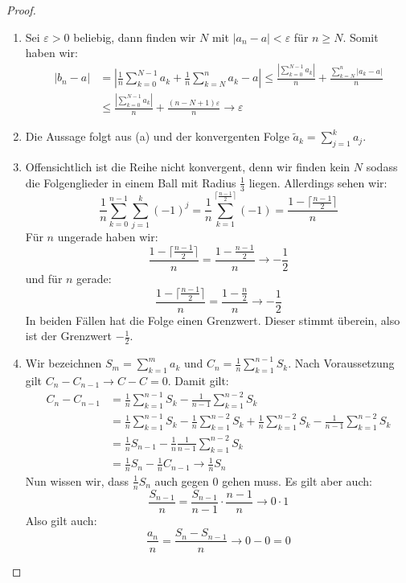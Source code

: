 \documentclass[11pt]{article}
\begin{document}
    \begin{proof}
        \begin{enumerate}[label = (\alph*)]
            \item Sei $\varepsilon>0$ beliebig, dann finden wir $N$ mit $|a_n-a|<\varepsilon$ für $n\geq N$.
            Somit haben wir:
            $$\begin{aligned}
                  |b_{n}-a|&= \left|\frac{1}{n}\sum_{k=0}^{N-1}a_k+ \frac{1}{n}\sum_{k=N}^{n} a_k-a\right|
                  \leq \frac{|\sum_{k=0}^{N-1}a_k|}{n} + \frac{\sum_{k=N}^{n}|a_k-a|}{n}\\&\leq
                  \frac{|\sum_{k=0}^{N-1}a_k|}{n} + \frac{(n-N+1)\varepsilon}{n}\to\varepsilon
            \end{aligned}$$
            \item Die Aussage folgt aus (a) und der konvergenten Folge $\tilde{a}_k =\sum_{j=1}^k a_j$.
            \item Offensichtlich ist die Reihe nicht konvergent, denn wir finden kein $N$ sodass die
            Folgenglieder in einem Ball mit Radius $\frac{1}{3}$ liegen. Allerdings sehen wir:
            $$\frac{1}{n}\sum_{k=0}^{n-1} \sum_{j=1}^k (-1)^j=\frac{1}{n}\sum_{k=1}^{\lceil\frac{n-1}{2}\rceil}(-1)
            =\frac{1-\lceil\frac{n-1}{2}\rceil}{n}$$
            Für $n$ ungerade haben wir:
            $$\frac{1-\lceil\frac{n-1}{2}\rceil}{n}=\frac{1-\frac{n-1}{2}}{n}\to-\frac{1}{2}$$
            und für $n$ gerade:
            $$\frac{1-\lceil\frac{n-1}{2}\rceil}{n}=\frac{1-\frac{n}{2}}{n}\to-\frac{1}{2}$$
            In beiden Fällen hat die Folge einen Grenzwert. Dieser stimmt überein, also ist der Grenzwert
            $-\frac{1}{2}$.
            \item Wir bezeichnen $S_m = \sum_{k=1}^m a_k$ und $C_n =\frac{1}{n}\sum_{k=1}^{n-1}S_k$.
            Nach Voraussetzung gilt $C_n-C_{n-1}\to C-C=0$. Damit gilt:
            $$\begin{aligned}
                  C_n-C_{n-1} &= \frac{1}{n}\sum_{k=1}^{n-1}S_k - \frac{1}{n-1}\sum_{k=1}^{n-2}S_k\\
                  &=\frac{1}{n}\sum_{k=1}^{n-1}S_k-\frac{1}{n}\sum_{k=1}^{n-2}S_k
                  + \frac{1}{n}\sum_{k=1}^{n-2}S_k- \frac{1}{n-1}\sum_{k=1}^{n-2}S_k \\
                  &= \frac{1}{n}S_{n-1} - \frac{1}{n}\frac{1}{n-1}\sum_{k=1}^{n-2}S_k\\
                  &= \frac{1}{n}S_n - \frac{1}{n}C_{n-1}\to \frac{1}{n}S_n
            \end{aligned}$$
            Nun wissen wir, dass $\frac{1}{n}S_n$ auch gegen $0$ gehen muss. Es gilt aber auch:
            $$\frac{S_{n-1}}{n} = \frac{S_{n-1}}{n-1}\cdot\frac{n-1}{n}\to 0\cdot 1$$
            Also gilt auch:
            $$\frac{a_n}{n}=\frac{S_n-S_{n-1}}{n}\to 0-0=0$$
        \end{enumerate}
    \end{proof}
\end{document}
